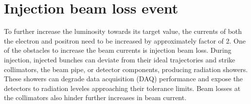 \chapter{Injection beam loss event}\label{sec:Injection beam loss event}

To further increase the luminosity towards its target value, the currents of both the electron and positron need to be increased by approximately factor of 2. One of the obstacles to increase the beam currents is injection beam loss. During injection, injected bunches can deviate from their ideal trajectories and strike collimators, the beam pipe, or detector components, producing radiation showers. These showers can degrade data acquisition (DAQ) performance and expose the detectors to radiation leveles approaching their tolerance limits. Beam losses at the collimators also hinder further increases in beam current. 